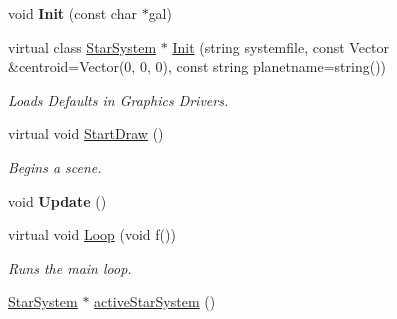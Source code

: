\begin{DoxyCompactItemize}
\item 
void {\bfseries Init} (const char $\ast$gal)\hypertarget{classUniverse_a6ef00141cfe3dfd3be9d69431fe4dbe4}{}\label{classUniverse_a6ef00141cfe3dfd3be9d69431fe4dbe4}

\item 
virtual class \hyperlink{classStarSystem}{Star\+System} $\ast$ \hyperlink{classUniverse_aa01b611ee2197aabf1282f5a3947c33e}{Init} (string systemfile, const Vector \&centroid=Vector(0, 0, 0), const string planetname=string())
\begin{DoxyCompactList}\small\item\em Loads Defaults in Graphics Drivers. \end{DoxyCompactList}\item 
virtual void \hyperlink{classUniverse_a18722326f55b37627846cb7652b4dfff}{Start\+Draw} ()\hypertarget{classUniverse_a18722326f55b37627846cb7652b4dfff}{}\label{classUniverse_a18722326f55b37627846cb7652b4dfff}

\begin{DoxyCompactList}\small\item\em Begins a scene. \end{DoxyCompactList}\item 
void {\bfseries Update} ()\hypertarget{classUniverse_a8f7cd03a827a2223a02651142092df21}{}\label{classUniverse_a8f7cd03a827a2223a02651142092df21}

\item 
virtual void \hyperlink{classUniverse_a845e0faab4c7f02ede00f38226bd0212}{Loop} (void f())\hypertarget{classUniverse_a845e0faab4c7f02ede00f38226bd0212}{}\label{classUniverse_a845e0faab4c7f02ede00f38226bd0212}

\begin{DoxyCompactList}\small\item\em Runs the main loop. \end{DoxyCompactList}\item 
\hyperlink{classStarSystem}{Star\+System} $\ast$ \hyperlink{classUniverse_ab8fbc57c0ea2c21172e5e21945884a0a}{active\+Star\+System} ()\hypertarget{classUniverse_ab8fbc57c0ea2c21172e5e21945884a0a}{}\label{classUniverse_ab8fbc57c0ea2c21172e5e21945884a0a}


\end{DoxyCompactItemize}
